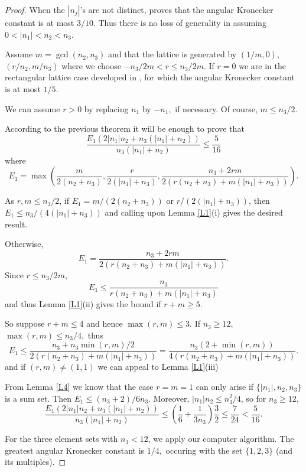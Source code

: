 \documentclass{amsart}
\begin{document}
\begin{proof}
When the $\left\vert n_{j}\right\vert $'s are not distinct, \cite{HR} proves that the angular Kronecker constant is at most $3/10$. Thus there is
no loss of generality in assuming $0<\left\vert n_{1}\right\vert
<n_{2}<n_{3} $.

Assume $m=\gcd (n_{2},n_{3})$ and that the lattice is generated by $(1/m,0)$, $(r/n_{2},m/n_{3})$ where we choose $-n_{3}/2m<r\leq n_{3}/2m$. If $r=0$
we are in the rectangular lattice case developed in \cite{HR}, for which
the angular Kronecker constant is at most $1/5$.

We can assume $r>0$ by replacing $n_{1}$ by $-n_{1},$ if necessary. Of
course, $m\leq n_{3}/2$.

According to the previous theorem it will be enough to prove that
$$
\frac{E_{1}\left( 2\left\vert n_{1}\right\vert n_{2}+n_{3}(\left\vert
n_{1}\right\vert +n_{2})\right) }{n_{3}(\left\vert n_{1}\right\vert +n_{2})}\leq \frac{5}{16}
$$
where
$$
E_{1}=\max \left( \frac{m}{2(n_{2}+n_{3})},\frac{r}{2(\left\vert
n_{1}\right\vert +n_{3})},\frac{n_{3}+2rm}{2\left(
r(n_{2}+n_{3})+m(\left\vert n_{1}\right\vert +n_{3})\right) }\right) .
$$

As $r,m\leq n_{3}/2$, if $E_{1}=m/(2(n_{2}+n_{3}))$ or $r/(2(\left\vert
n_{1}\right\vert +n_{3}))$, then $E_{1}\leq n_{3}/(4(\left\vert
n_{1}\right\vert +n_{3}))$ and calling upon Lemma \ref{L1}(i) gives the
desired result.

Otherwise,
$$
E_{1}=\frac{n_{3}+2rm}{2\left( r(n_{2}+n_{3})+m(\left\vert n_{1}\right\vert
+n_{3})\right) }.
$$
Since $r\leq n_{3}/2m$,
$$
E_{1}\leq \frac{n_{3}}{r(n_{2}+n_{3})+m(\left\vert n_{1}\right\vert +n_{3})}
$$
and thus Lemma \ref{L1}(ii) gives the bound if $r+m\geq 5$.

So suppose $r+m\leq 4$ and hence $\max (r,m)\leq 3.$ If $n_{3}\geq 12$, $\max (r,m)\leq n_{3}/4,$ thus
$$
E_{1}\leq \frac{n_{3}+n_{3}\min (r,m)/2}{2(r(n_{2}+n_{3})+m(\left\vert
n_{1}\right\vert +n_{3}))}=\frac{n_{3}(2+\min (r,m))}{4(r(n_{2}+n_{3})+m(\left\vert n_{1}\right\vert +n_{3}))}.
$$
and if $(r,m)\neq (1,1)$ we can appeal to Lemma \ref{L1}(iii)

From Lemma \ref{L4} we know that the case $r=m=1$ can only arise if $\{\left\vert n_{1}\right\vert ,n_{2},n_{3}\}$ is a sum set. Then $E_{1}\leq
(n_{3}+2)/6n_{3}$. Moreover, $\left\vert n_{1}\right\vert n_{2}\leq
n_{3}^{2}/4$, so for $n_{3}\geq 12$,$$
\frac{E_{1}\left( 2\left\vert n_{1}\right\vert n_{2}+n_{3}(\left\vert
n_{1}\right\vert +n_{2})\right) }{n_{3}(\left\vert n_{1}\right\vert +n_{2})}\leq \left( \frac{1}{6}+\frac{1}{3n_{3}}\right) \frac{3}{2}\leq \frac{7}{24}<\frac{5}{16}.
$$

For the three element sets with $n_{3}<12$, we apply our computer algorithm.
The greatest angular Kronecker constant is $1/4,$ occuring with the set $\{1,2,3\}$ (and its multiples).
\end{proof}
\end{document}

